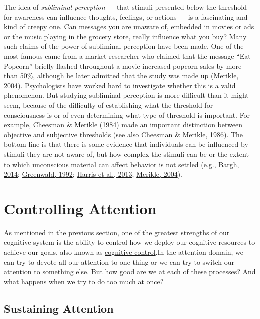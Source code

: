 \documentclass[
]{krantz}
\begin{document}
The idea of \emph{subliminal perception} --- that stimuli presented below the threshold for awareness can influence thoughts, feelings, or actions --- is a fascinating and kind of creepy one. Can messages you are unaware of, embedded in movies or ads or the music playing in the grocery store, really influence what you buy? Many such claims of the power of subliminal perception have been made. One of the most famous came from a market researcher who claimed that the message ``Eat Popcorn'' briefly flashed throughout a movie increased popcorn sales by more than 50\%, although he later admitted that the study was made up (\protect\hyperlink{ref-Merikle2004}{Merikle, 2004}). Psychologists have worked hard to investigate whether this is a valid phenomenon. But studying subliminal perception is more difficult than it might seem, because of the difficulty of establishing what the threshold for consciousness is or of even determining what type of threshold is important. For example, Cheesman \& Merikle (\protect\hyperlink{ref-Cheesman1984}{1984}) made an important distinction between objective and subjective thresholds (see also \protect\hyperlink{ref-Cheesman1986}{Cheesman \& Merikle, 1986}). The bottom line is that there is some evidence that individuals can be influenced by stimuli they are not aware of, but how complex the stimuli can be or the extent to which unconscious material can affect behavior is not settled (e.g., \protect\hyperlink{ref-Bargh2014}{Bargh, 2014}; \protect\hyperlink{ref-Greenwald1992}{Greenwald, 1992}; \protect\hyperlink{ref-harris2013two}{Harris et al., 2013}; \protect\hyperlink{ref-Merikle2004}{Merikle, 2004}).

\hypertarget{controlling-attention}{%
\section{Controlling Attention}\label{controlling-attention}}

As mentioned in the previous section, one of the greatest strengths of our cognitive system is the ability to control how we deploy our cognitive resources to achieve our goals, also known as \protect\hyperlink{cognitive-control}{cognitive control}.In the attention domain, we can try to devote all our attention to one thing or we can try to switch our attention to something else. But how good are we at each of these processes? And what happens when we try to do too much at once?

\hypertarget{sustaining-attention}{%
\subsection*{Sustaining Attention}\label{sustaining-attention}}
\end{document}
